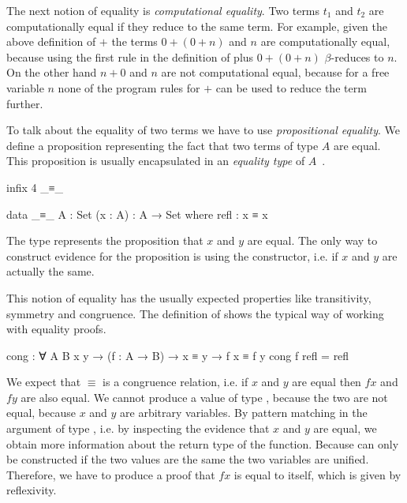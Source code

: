 The next notion of equality is \textit{computational equality}.
Two terms $t_1$ and $t_2$ are computationally equal if they reduce to the same
term.
For example, given the above definition of $+$ the terms $0+(0+n)$ and $n$ are
computationally equal, because using the first rule in the definition of plus
$0+(0+n)$ $\beta$-reduces to $n$.
On the other hand $n+0$ and $n$ are not computational equal, because for a free
variable $n$ none of the program rules for $+$ can be used to reduce the term
further.

To talk about the equality of two terms we have to use \textit{propositional
equality}.
We define a proposition representing the fact that two terms of type $A$ are
equal.
This proposition is usually encapsulated in an \textit{equality type} of
$A$~\cite{hottbook,DBLP:conf/afp/Norell08,DBLP:journals/scp/KokkeSW20}.

\begin{code}[hide]
infix 4 _≡_
\end{code}
\begin{code}
data _≡_ {A : Set} (x : A) : A → Set where
  refl : x ≡ x
\end{code}
The type
\AgdaSpace{}\AgdaSpace{}
represents the proposition that $x$ and $y$ are equal.
The only way to construct evidence for the proposition is using the
 constructor, i.e. if $x$ and $y$ are actually
the same.

This notion of equality has the usually expected properties like transitivity,
symmetry and congruence.
The definition of  shows the typical way of working with
equality proofs.

\begin{code}
cong : ∀ {A B x y} → (f : A → B) → x ≡ y → f x ≡ f y
cong f refl = refl
\end{code}
We expect that $≡$ is a congruence relation, i.e. if $x$ and $y$ are equal then
$f x$ and $f y$ are also equal.
We cannot produce a value of type
\AgdaSpace{}\AgdaSpace{}\AgdaSpace{}\AgdaSpace{},
because the two are not equal, because $x$ and $y$ are arbitrary variables.
By pattern matching in the argument of type 
\AgdaSpace{}\AgdaSpace{},
i.e. by inspecting the evidence that $x$ and $y$ are equal, we obtain more
information about the return type of the function.
Because  can only be constructed if the two
values are the same the two variables are unified.
Therefore, we have to produce a proof that $f x$ is equal to itself, which is
given by reflexivity.

